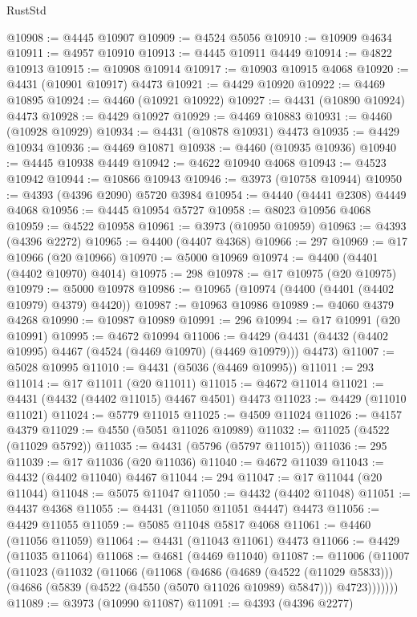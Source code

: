\begin{lexlean}{RustStd}
\begin{coremodule}
@10908 := @4445 @10907
@10909 := @4524 @5056
@10910 := @10909 @4634
@10911 := @4957 @10910
@10913 := @4445 @10911 @4449
@10914 := @4822 @10913
@10915 := @10908 @10914
@10917 := @10903 @10915 @4068
@10920 := @4431 (@10901 @10917) @4473
@10921 := @4429 @10920
@10922 := @4469 @10895
@10924 := @4460 (@10921 @10922)
@10927 := @4431 (@10890 @10924) @4473
@10928 := @4429 @10927
@10929 := @4469 @10883
@10931 := @4460 (@10928 @10929)
@10934 := @4431 (@10878 @10931) @4473
@10935 := @4429 @10934
@10936 := @4469 @10871
@10938 := @4460 (@10935 @10936)
@10940 := @4445 @10938 @4449
@10942 := @4622 @10940 @4068
@10943 := @4523 @10942
@10944 := @10866 @10943
@10946 := @3973 (@10758 @10944)
@10950 := @4393 (@4396 @2090) @5720 @3984
@10954 := @4440 (@4441 @2308) @4449 @4068
@10956 := @4445 @10954 @5727
@10958 := @8023 @10956 @4068
@10959 := @4522 @10958
@10961 := @3973 (@10950 @10959)
@10963 := @4393 (@4396 @2272)
@10965 := @4400 (@4407 @4368)
@10966 := 297
@10969 := @17 @10966 (@20 @10966)
@10970 := @5000 @10969
@10974 := @4400 (@4401 (@4402 @10970) @4014)
@10975 := 298
@10978 := @17 @10975 (@20 @10975)
@10979 := @5000 @10978
@10986 := @10965 (@10974 (@4400 (@4401 (@4402 @10979) @4379) @4420))
@10987 := @10963 @10986
@10989 := @4060 @4379 @4268
@10990 := @10987 @10989
@10991 := 296
@10994 := @17 @10991 (@20 @10991)
@10995 := @4672 @10994
@11006 := @4429 (@4431 (@4432 (@4402 @10995) @4467 (@4524 (@4469 @10970) (@4469 @10979))) @4473)
@11007 := @5028 @10995
@11010 := @4431 (@5036 (@4469 @10995))
@11011 := 293
@11014 := @17 @11011 (@20 @11011)
@11015 := @4672 @11014
@11021 := @4431 (@4432 (@4402 @11015) @4467 @4501) @4473
@11023 := @4429 (@11010 @11021)
@11024 := @5779 @11015
@11025 := @4509 @11024
@11026 := @4157 @4379
@11029 := @4550 (@5051 @11026 @10989)
@11032 := @11025 (@4522 (@11029 @5792))
@11035 := @4431 (@5796 (@5797 @11015))
@11036 := 295
@11039 := @17 @11036 (@20 @11036)
@11040 := @4672 @11039
@11043 := @4432 (@4402 @11040) @4467
@11044 := 294
@11047 := @17 @11044 (@20 @11044)
@11048 := @5075 @11047
@11050 := @4432 (@4402 @11048)
@11051 := @4437 @4368
@11055 := @4431 (@11050 @11051 @4447) @4473
@11056 := @4429 @11055
@11059 := @5085 @11048 @5817 @4068
@11061 := @4460 (@11056 @11059)
@11064 := @4431 (@11043 @11061) @4473
@11066 := @4429 (@11035 @11064)
@11068 := @4681 (@4469 @11040)
@11087 := @11006
    (@11007
      (@11023
        (@11032
          (@11066
            (@11068
              (@4686
                (@4689 (@4522 (@11029 @5833)))
                (@4686 (@5839 (@4522 (@4550 (@5070 @11026 @10989) @5847))) @4723)))))))
@11089 := @3973 (@10990 @11087)
@11091 := @4393 (@4396 @2277)

\end{coremodule}
\end{lexlean}
